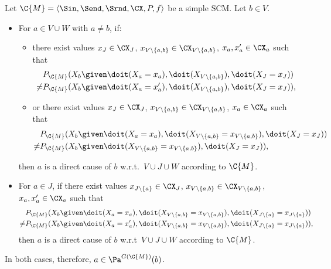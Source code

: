 \begin{Cor}\label{cor:scm_identify_direct_causal_relation}
  Let $\C{M} = \langle \Sin, \Send, \Srnd, \CX, P, f \rangle$ be a simple SCM.
  Let $b \in V$.

  \begin{itemize}
    \item For $a \in V \cup W$ with $a \ne b$, if:
  \begin{itemize}
    \item there exist values $x_J \in \CX_J$, $x_{V\setminus\{a,b\}} \in \CX_{V\setminus\{a,b\}}$, $x_a,x_a' \in \CX_a$ such that
      \begin{equation*}\begin{split}
        & P_{\C{M}}(X_b \given \doit(X_a=x_a),\doit(X_{V\setminus\{a,b\}}),\doit(X_J=x_J)) \\
        \ne & P_{\C{M}}(X_b \given \doit(X_a=x_a'),\doit(X_{V\setminus\{a,b\}}),\doit(X_J=x_J)),
      \end{split}\end{equation*}
    \item or there exist values $x_J \in \CX_J$, $x_{V\setminus\{a,b\}} \in \CX_{V\setminus\{a,b\}}$, $x_a \in \CX_a$ such that
      \begin{equation*}\begin{split}
        & P_{\C{M}}(X_b \given \doit(X_a=x_a),\doit(X_{V\setminus\{a,b\}}=x_{V\setminus\{a,b\}}),\doit(X_J=x_J)) \\
        \ne & P_{\C{M}}(X_b \given \doit(X_{V\setminus\{a,b\}}=x_{V\setminus\{a,b\}}),\doit(X_J=x_J)),
      \end{split}\end{equation*}
  \end{itemize}
  then $a$ is a direct cause of $b$ w.r.t.\ $V \cup J \cup W$ according to $\C{M}$.
    \item For $a \in J$, if there exist values $x_{J\setminus\{a\}} \in \CX_J$, $x_{V\setminus\{a,b\}} \in \CX_{V\setminus\{a,b\}}$, $x_a,x_a' \in \CX_a$ 
  such that
      \begin{equation*}\begin{split}
        & P_{\C{M}}(X_b \given \doit(X_a=x_a),\doit(X_{V\setminus\{a,b\}}=x_{V\setminus\{a,b\}}),\doit(X_{J\setminus \{a\}}=x_{J\setminus \{a\}})) \\
        \ne & P_{\C{M}}(X_b \given \doit(X_a=x_a'),\doit(X_{V\setminus\{a,b\}}=x_{V\setminus\{a,b\}}),\doit(X_{J\setminus\{a\}}=x_{J\setminus\{a\}})),
      \end{split}\end{equation*}
  then $a$ is a direct cause of $b$ w.r.t\ $V \cup J \cup W$ according to $\C{M}$.
  \end{itemize}
  In both cases, therefore, $a \in \Pa^{G(\C{M})}(b)$.
\end{Cor}
